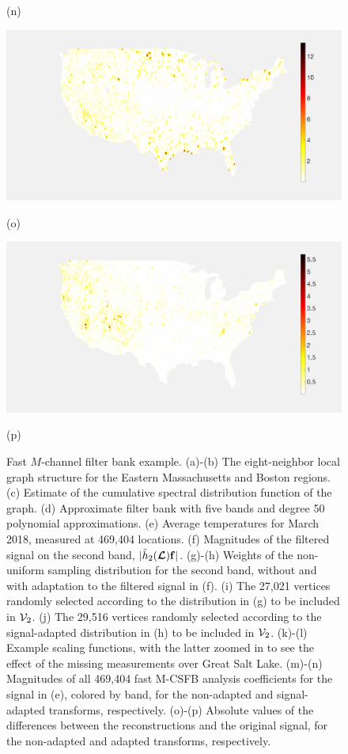 \documentclass[journal, 10pt]{IEEEtran}
\begin{document}
\begin{figure}[tb]
\begin{minipage}[m]{0.24\linewidth}
\centerline{\small{(n)}}
\end{minipage}
\begin{minipage}[m]{0.24\linewidth}
\centerline{\includegraphics[width=.85\linewidth]{fig_temp_error}}
\centerline{\small{(o)}}
\end{minipage}
\begin{minipage}[m]{0.24\linewidth}
\centerline{\includegraphics[width=.85\linewidth]{fig_temp_error_adapted}}
\centerline{\small{(p)}}
\end{minipage}
\caption{Fast $M$-channel filter bank example. (a)-(b) The eight-neighbor local graph structure for the Eastern Massachusetts and Boston regions.
(c) Estimate of the cumulative spectral distribution function of the graph. (d) Approximate filter bank with five bands and degree 50 polynomial approximations. (e) Average temperatures for March 2018, measured at 469,404 locations. (f) Magnitudes of the filtered signal on the second band, $|\tilde{h}_2(\boldsymbol{\mathcal{L}}){\bf f}|$. (g)-(h) Weights of the non-uniform sampling distribution for the second band, without and with adaptation to the filtered signal in (f). (i) The 27,021 vertices randomly selected according to the distribution in (g) to be included in ${\mathcal{V}}_2$. (j) The 29,516 vertices randomly selected according to the signal-adapted distribution in (h) to be included in ${\mathcal{V}}_2$. (k)-(l) Example scaling functions, with the latter zoomed in to see the effect of the missing measurements over Great Salt Lake. (m)-(n) %
Magnitudes of all 469,404 fast M-CSFB analysis coefficients for the %
 signal in (e), colored by band, for the non-adapted and signal-adapted transforms, respectively. (o)-(p) Absolute values of the differences between the reconstructions and the original %
signal, %
for the non-adapted and adapted transforms, respectively. \vspace{-.1in}
} \label{Fig:temperature}
\end{figure}
\end{document}
